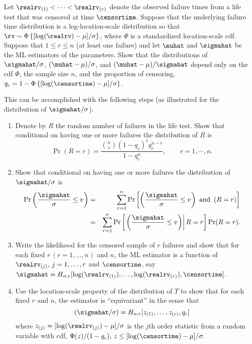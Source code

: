 

\begin{exercise1}
Let $\realrv_{(1)}< \dots < \realrv_{(r)}$
denote the observed failure times from a 
life test that was censored at time
$\censortime$. Suppose that the underlying failure time
distribution is a log-location-scale distribution so that
$\rv \sim \Phi \left \{ [\log(\realrv)-\mu]/\sigma \right \}$,
where $\Phi$ is a standardized location-scale cdf.
Suppose that $1 \leq r \leq n$ (at least one failure) and
let $\muhat$ and $\sigmahat$ be the ML 
estimators of the parameters.
Show that the distributions of $\sigmahat/\sigma$,
$(\muhat-\mu)/\sigma$, and $(\muhat-\mu)/\sigmahat$ 
depend only on the cdf $\Phi$, the
sample size $n$, and the proportion of censoring, 
$q_{c}=1-\Phi \left \{ [\log(\censortime)-\mu]/\sigma \right \}$.

This can be accomplished with the following steps (as illustrated
for the distribution of $\sigmahat/\sigma$).
\begin{enumerate}
\item
Denote by $R$ the random number of failures in the life test.
Show that conditional
on having one or more failures the
distribution of $R$ is
\begin{displaymath}
\Pr(R=r)=\frac
         { 	
{n \choose r }
(1-q_{c})^{r} q_{c}^{n-r} } 	 {
1-q_{c}^{n}}, \qquad r=1,\cdots, n.
\end{displaymath}
\item
Show that conditional
on having one or more failures the distribution of
$\sigmahat/\sigma$ is
\begin{eqnarray*}
\Pr \left (
     \frac{\sigmahat} 	 {\sigma} 	\le v \right )&=&
\sum_{r=1}^{n}
\Pr\left [
     \left ( \frac{\sigmahat} 	 {\sigma} 	\le v \right ) \,\,
\mbox{and} 	 \,\, \left ( R=r \right ) \right ]
\\
&=&
\sum_{r=1}^{n}
\Pr\left [
     \left.  \left ( \frac{\sigmahat} 	 {\sigma} 	\le v \right )
\right | R=r \right ]
\Pr (R=r).
\end{eqnarray*}
\item
Write the likelihood for the censored sample of $r$ failures and
show that for each fixed $r\, (r=1, \dots, n)$ and $n$, the ML estimator is
a function of $\realrv_{(j)},\, j=1,\dots,r$ and
$\censortime$, say $\sigmahat = H_{n:r}[\log(\realrv_{(1)}), \dots,
\log(\realrv_{(r)}),
\censortime]$.  
\item
Use the location-scale property of the distribution of $T$ to 
show that for each fixed 
$r$ and $n$, the estimator is ``equivariant'' in the
sense that 
\begin{displaymath}
(\sigmahat/\sigma) =  H_{n:r}[z_{(1)}, \dots,z_{(r)} , q_{c}]
\end{displaymath}
where
$z_{(j)}=[\log(\realrv_{(j)})-\mu]/\sigma$ is the $j$th order statistic
from a random variable with cdf,
$
\Phi(z)/(1-q_{c}), \, z \le [\log(\censortime)-\mu]/\sigma.
$
\end{enumerate}
\end{exercise1}

